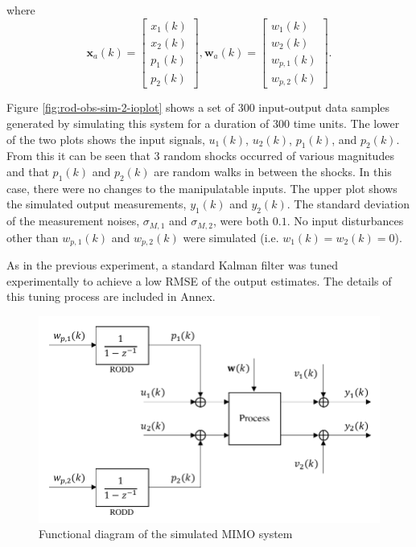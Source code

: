 where
\begin{equation} \label{eq:sim-sys-2x2-ss-aug2}
	\mathbf{x}_{a}(k) = \left[\begin{array}{l}
		x_{1}(k) \\
		x_{2}(k) \\
		p_{1}(k) \\
		p_{2}(k)
	\end{array}\right], \mathbf{w}_{a}(k) = \left[\begin{array}{l}
		w_1(k) \\
		w_2(k) \\
		w_{p,1}(k) \\
		w_{p,2}(k)
	\end{array}\right].
\end{equation}

Figure \ref{fig:rod-obs-sim-2-ioplot} shows a set of  300 input-output  data samples generated by simulating this system for a duration of 300 time units. The lower of the two plots shows the input signals, $u_1(k)$, $u_2(k)$, $p_1(k)$, and $p_2(k)$. From this it can be seen that 3 random shocks occurred of various magnitudes and that $p_1(k)$ and $p_2(k)$ are random walks in between the shocks. In this case, there were no changes to the manipulatable inputs. The upper plot shows the simulated output measurements, $y_1(k)$ and $y_2(k)$. The standard deviation of the measurement noises, $\sigma_{M,1}$ and $\sigma_{M,2}$, were both $0.1$. No input disturbances other than $w_{p,1}(k)$ and $w_{p,2}(k)$ were simulated (i.e. $w_1(k)=w_2(k)=0$).

As in the previous experiment, a standard Kalman filter was tuned experimentally to achieve a low RMSE of the output estimates.  The details of this tuning process are included in Annex. 

\begin{figure}[htp]
	\centering
	\includegraphics[width=11.5cm]{images/sim-sys-diag-2x2.pdf}
	\caption{Functional diagram of the simulated MIMO system}
	\label{fig:sim-sys-diag-2x2}
\end{figure}

